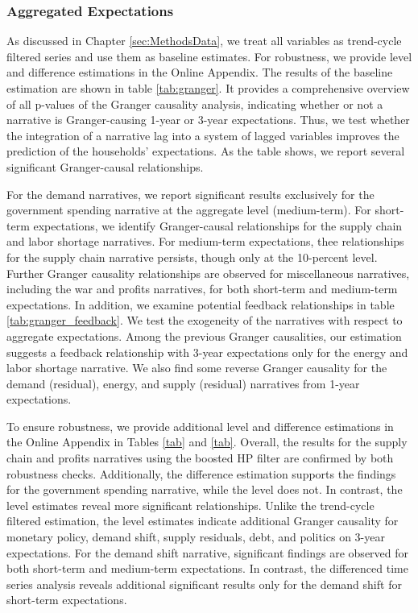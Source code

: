 \subsubsection{Aggregated Expectations}

As discussed in Chapter \ref{sec:MethodsData}, we treat all variables as trend-cycle filtered series and use them as baseline estimates. For robustness, we provide level and difference estimations in the Online Appendix. The results of the baseline estimation are shown in table \ref{tab:granger}. It provides a comprehensive overview of all p-values of the Granger causality analysis, indicating whether or not a narrative is Granger-causing 1-year or 3-year expectations. Thus, we test whether the integration of a narrative lag into a system of lagged variables improves the prediction of the households' expectations. As the table shows, we report several significant Granger-causal relationships.

For the demand narratives, we report significant results exclusively for the government spending narrative at the aggregate level (medium-term). For short-term expectations, we identify Granger-causal relationships for the supply chain and labor shortage narratives. For medium-term expectations, thee relationships for the supply chain narrative persists, though only at the 10-percent level. Further Granger causality relationships are observed for miscellaneous narratives, including the war and profits narratives, for both short-term and medium-term expectations. In addition, we examine potential feedback relationships in table \ref{tab:granger_feedback}. We test the exogeneity of the narratives with respect to aggregate expectations. Among the previous Granger causalities, our estimation suggests a feedback relationship with 3-year expectations only for the energy and labor shortage narrative. We also find some reverse Granger causality for the demand (residual), energy, and supply (residual) narratives from 1-year expectations.



To ensure robustness, we provide additional level and difference estimations in the Online Appendix in Tables \ref{tab} and \ref{tab}. Overall, the results for the supply chain and profits narratives using the boosted HP filter are confirmed by both robustness checks. Additionally, the difference estimation supports the findings for the government spending narrative, while the level does not. In contrast, the level estimates reveal more significant relationships. Unlike the trend-cycle filtered estimation, the level estimates indicate additional Granger causality for monetary policy, demand shift, supply residuals, debt, and politics on 3-year expectations. For the demand shift narrative, significant findings are observed for both short-term and medium-term expectations. In contrast, the differenced time series analysis reveals additional significant results only for the demand shift for short-term expectations.

